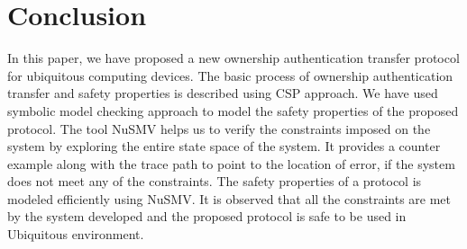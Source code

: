 \documentclass[letterpaper]{article}
\begin{document}
\section{Conclusion}
\label{g}
In this paper, we have proposed a new ownership authentication transfer protocol for ubiquitous computing devices. The basic process of ownership authentication transfer and safety properties is described using CSP approach. We have used symbolic model checking approach to model the safety properties of the proposed protocol. The tool NuSMV helps us to verify the constraints imposed on the system by exploring the entire state space of the system. It provides a counter example along with the trace path to point to the location of error, if the system does not meet any of the constraints. The safety properties of a protocol is modeled efficiently using NuSMV. It is observed that all the constraints are met by the system developed and the proposed protocol is safe to be used in Ubiquitous environment.




\end{document}
